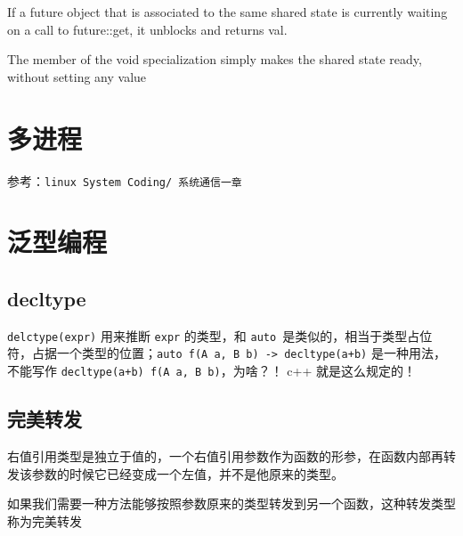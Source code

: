 \documentclass[UTF8,a4paper,12pt]{ctexbook}
\begin{document}
			If a future object that is associated to the same shared state is currently waiting on a call to future::get, it unblocks and returns val.
			
			The member of the void specialization simply makes the shared state ready, without setting any value	
	

\chapter{多进程}
	参考：\verb|linux System Coding/ 系统通信一章|


	 
\chapter{泛型编程}
	
	\section{decltype}
		\verb|delctype(expr)| 用来推断 \verb|expr| 的类型，和 \verb|auto |是类似的，相当于类型占位符，占据一个类型的位置；\verb|auto f(A a, B b) -> decltype(a+b)| 是一种用法，不能写作 \verb|decltype(a+b) f(A a, B b)|，为啥？！ c++ 就是这么规定的！
		
		
	\section{完美转发}
		右值引用类型是独立于值的，一个右值引用参数作为函数的形参，在函数内部再转发该参数的时候它已经变成一个左值，并不是他原来的类型。
					
		如果我们需要一种方法能够按照参数原来的类型转发到另一个函数，这种转发类型称为完美转发
		
\end{document}
